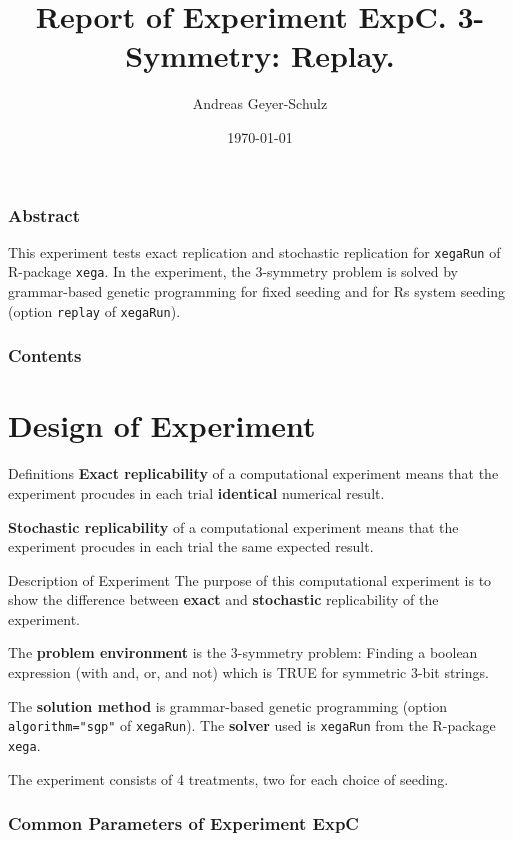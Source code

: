 \documentclass[18pt,c]{beamer}
\begin{document}
\title{Report of Experiment ExpC. 3-Symmetry: Replay. }
\author{Andreas Geyer-Schulz}
\date{\today}
\begin{frame}
\titlepage
\end{frame}
\begin{frame}
\frametitle{Abstract}
This experiment tests exact replication and stochastic replication
for {\tt xegaRun} of R-package {\tt xega}.
In the experiment, the 3-symmetry problem is solved
by grammar-based genetic programming for fixed seeding and for
Rs system seeding (option {\tt replay} of {\tt xegaRun}).%
\end{frame}
\begin{frame}[t, allowframebreaks]
\frametitle{Contents}
\tableofcontents[subsubsectionstyle=hide]
\vfill
\end{frame}
\clearpage
\section{Design of Experiment}
\begin{frame}
\vspace*{2mm}
\begin{block}{
Definitions
}
{\bf Exact replicability} of a computational experiment means
that the experiment procudes in each trial {\bf identical}
numerical result.
 
{\bf Stochastic replicability} of a computational experiment means
that the experiment procudes in each trial the same 
expected result.
\end{block}
\end{frame}%
\begin{frame}
\vspace*{2mm}
\begin{block}{
Description of Experiment
}
The purpose of this computational experiment is to show the difference
between {\bf exact} and {\bf stochastic} replicability of the experiment.
 
The {\bf problem environment} is the 3-symmetry problem: 
Finding a boolean expression (with and, or, and not)
which is TRUE for symmetric 3-bit strings.
 
The {\bf solution method} is grammar-based genetic programming
(option {\tt algorithm="sgp"}  of {\tt xegaRun}).
The {\bf solver} used is {\tt xegaRun} from the R-package {\tt xega}.
 
The experiment consists of 4 treatments, two for each choice of seeding.
\end{block}
\end{frame}%
 \begin{frame}
 \fontsize{8pt}{9pt}\selectfont
 \frametitle{ Common Parameters of Experiment ExpC }

 \label{ExpCCommonTable000.tex}  
 \end{frame}
\end{document}
